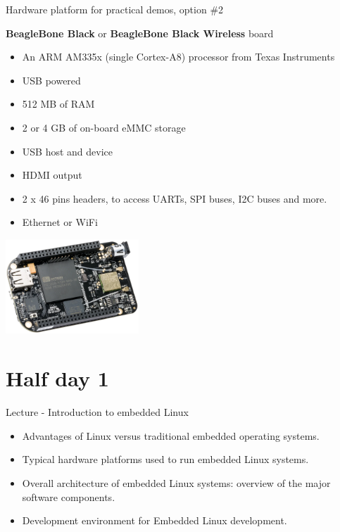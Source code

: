 \documentclass[a4paper,12pt,obeyspaces,spaces,hyphens]{article}
\begin{document}
\feagendatwocolumn
{Hardware platform for practical demos, option \#2}
{
  {\bf BeagleBone Black} or {\bf BeagleBone Black Wireless} board
  \begin{itemize}
  \item An ARM AM335x (single Cortex-A8) processor from Texas
    Instruments
  \item USB powered
  \item 512 MB of RAM
  \item 2 or 4 GB of on-board eMMC storage
  \item USB host and device
  \item HDMI output
  \item 2 x 46 pins headers, to access UARTs, SPI buses, I2C buses
    and more.
  \item Ethernet or WiFi
  \end{itemize}
}
{}
{
  \begin{center}
    \includegraphics[width=5cm]{../slides/beagleboneblack-board/beagleboneblack.png}
  \end{center}
}

\section{Half day 1}

\feagendaonecolumn
{Lecture - Introduction to embedded Linux}
{
  \begin{itemize}
  \item Advantages of Linux versus traditional embedded operating
    systems.
  \item Typical hardware platforms used to run embedded Linux systems.
  \item Overall architecture of embedded Linux systems: overview of
    the major software components.
  \item Development environment for Embedded Linux development.
  \end{itemize}
}
\end{document}
